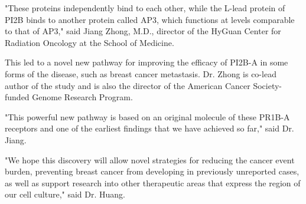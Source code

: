 \documentclass{article}
\begin{document}
"These proteins independently bind to each other, while the L-lead protein of PI2B binds to another protein called AP3, which functions at levels comparable to that of AP3," said Jiang Zhong, M.D., director of the HyGuan Center for Radiation Oncology at the School of Medicine.

This led to a novel new pathway for improving the efficacy of PI2B-A in some forms of the disease, such as breast cancer metastasis. Dr. Zhong is co-lead author of the study and is also the director of the American Cancer Society-funded Genome Research Program.

"This powerful new pathway is based on an original molecule of these PR1B-A receptors and one of the earliest findings that we have achieved so far," said Dr. Jiang.

"We hope this discovery will allow novel strategies for reducing the cancer event burden, preventing breast cancer from developing in previously unreported cases, as well as support research into other therapeutic areas that express the region of our cell culture," said Dr. Huang.
\end{document}
